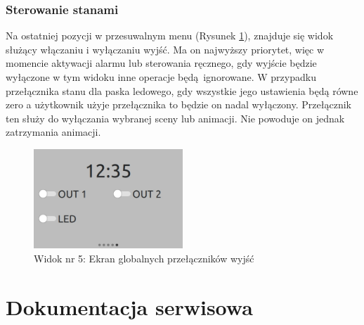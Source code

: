 \documentclass[12pt, eng, twoside, openany, final]{mgr}
\begin{document}
        \subsection{Sterowanie stanami}
        Na ostatniej pozycji w przesuwalnym menu (Rysunek \ref{fig:view6}), znajduje się widok służący włączaniu i wyłączaniu wyjść. Ma on najwyższy priorytet, więc w momencie aktywacji alarmu lub sterowania ręcznego, gdy wyjście będzie wyłączone w tym widoku inne operacje będą ignorowane. W przypadku przełącznika stanu dla paska ledowego, gdy wszystkie jego ustawienia będą równe zero a użytkownik użyje przełącznika to będzie on nadal wyłączony. Przełącznik ten służy do wyłączania wybranej sceny lub animacji. Nie powoduje on jednak zatrzymania animacji.
            \begin{figure}[H]
            \begin{center}
                \includegraphics[width=0.5\textwidth]{ui_global.jpg}
                \caption{Widok nr 5: Ekran globalnych przełączników wyjść} \label{fig:view6}
            \end{center}
            \end{figure}
    
    
    \newpage

\chapter{Dokumentacja serwisowa}
\thispagestyle{fancy}
\end{document}
